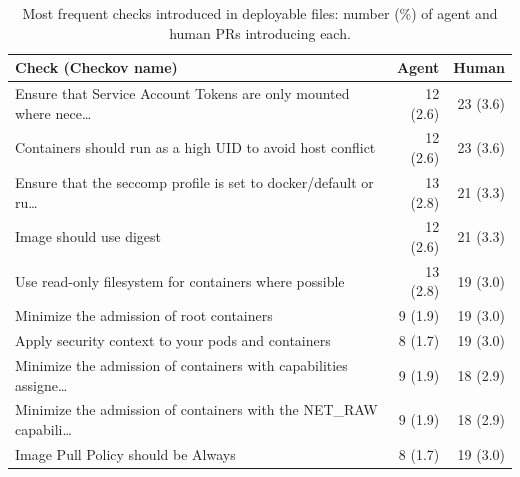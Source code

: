 \begin{table}[t]\centering\caption{Most frequent checks introduced in deployable files: number (\%) of agent and human PRs introducing each.}\label{tab:checks}\footnotesize\begin{tabular}{@{}p{5.1cm}rr@{}}\toprule Check (Checkov name) & Agent & Human\\\midrule
Ensure that Service Account Tokens are only mounted where nece… & 12 (2.6) & 23 (3.6) \\
Containers should run as a high UID to avoid host conflict & 12 (2.6) & 23 (3.6) \\
Ensure that the seccomp profile is set to docker/default or ru… & 13 (2.8) & 21 (3.3) \\
Image should use digest & 12 (2.6) & 21 (3.3) \\
Use read-only filesystem for containers where possible & 13 (2.8) & 19 (3.0) \\
Minimize the admission of root containers & 9 (1.9) & 19 (3.0) \\
Apply security context to your pods and containers & 8 (1.7) & 19 (3.0) \\
Minimize the admission of containers with capabilities assigne… & 9 (1.9) & 18 (2.9) \\
Minimize the admission of containers with the NET\_RAW capabili… & 9 (1.9) & 18 (2.9) \\
Image Pull Policy should be Always & 8 (1.7) & 19 (3.0) \\
\bottomrule\end{tabular}\end{table}
